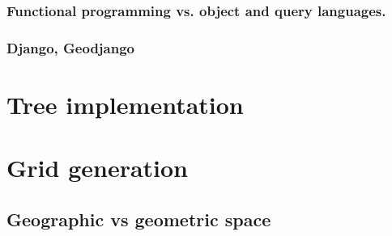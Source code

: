 \subsubsection{Functional programming vs. object and query languages.}

\subsubsection{Django, Geodjango}


\section{Tree implementation}


\section{Grid generation}
\subsection{Geographic vs geometric space}
